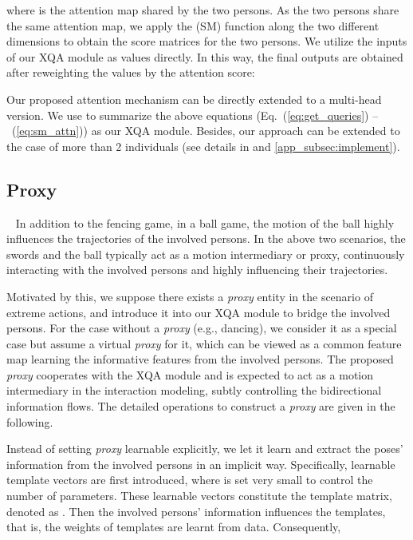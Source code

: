 \documentclass[10pt,twocolumn,letterpaper]{article}
\begin{document}
where  is the attention map shared by the two persons.
As the two persons share the same attention map, we apply the  (SM) function along the two different dimensions to obtain the score matrices for the two persons. 
We utilize the inputs of our XQA module as values directly.  
In this way, the final outputs are obtained after reweighting the values by the attention score:
\vskip -0.2in

\vskip -0.05in
Our proposed attention mechanism can be directly extended to a multi-head version. 
We use  to summarize the above equations (Eq.~(\ref{eq:get_queries}) --~(\ref{eq:sm_attn})) as our XQA module. 
Besides, our approach can be extended to the case of more than 2 individuals (see details in  and \cref{app_subsec:implement}). 


\subsection{Proxy}~\label{subsec:proxy}
In addition to the fencing game, in a ball game, the motion of the ball highly influences the trajectories of the involved persons. 
In the above two scenarios, the swords and the ball typically act as a motion intermediary or proxy, continuously interacting with the involved persons and highly influencing their trajectories. 

Motivated by this, we suppose there exists a \textit{proxy} entity in the scenario of extreme actions, and introduce it into our XQA module to bridge the involved persons.
For the case without a \textit{proxy} (e.g., dancing), we consider it as a special case but assume a virtual \textit{proxy} for it, which can be viewed as a common feature map learning the informative features from the involved persons. 
The proposed \textit{proxy} cooperates with the XQA module and is expected to act as a motion intermediary in the interaction modeling, subtly controlling the bidirectional information flows.
The detailed operations to construct a \textit{proxy} are given in the following.


Instead of setting \textit{proxy} learnable explicitly, we let it learn and extract the poses' information from the involved persons in an implicit way. 
Specifically,  learnable template vectors  are first introduced, where  is set very small to control the number of parameters. 
These learnable vectors constitute the template matrix, denoted as . 
Then the involved persons' information influences the templates, that is, the weights of templates are learnt from data. Consequently, 
\vskip -0.1in
\end{document}
